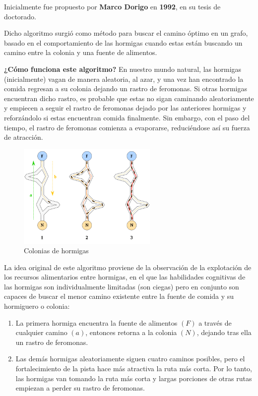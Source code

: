 \documentclass[a4paper, 11pt]{article} %
\begin{document}
Inicialmente fue propuesto por \textbf{Marco Dorigo} en \textbf{1992}, en su tesis de doctorado.

Dicho algoritmo surgió como método para buscar el camino óptimo en un grafo, basado en el comportamiento de las hormigas cuando estas están buscando un camino entre la colonia y una fuente de alimentos.

\textbf{¿Cómo funciona este algoritmo?} En nuestro mundo natural, las hormigas (inicialmente) vagan de manera aleatoria, al azar, y una vez han encontrado la comida regresan a su colonia dejando un rastro de feromonas. Si otras hormigas encuentran dicho rastro, es probable que estas no sigan caminando aleatoriamente y empiecen a seguir el rastro de feromonas dejado por las anteriores hormigas y reforzándolo si estas encuentran comida finalmente. Sin embargo, con el paso del tiempo, el rastro de feromonas comienza a evaporarse, reduciéndose así su fuerza de atracción.

\begin{figure}[H]
\centering
\includegraphics[width=0.6\textwidth]{Hormigas.png}
\caption{Colonias de hormigas}
\label{Colonias de hormigas}
\end{figure}

La idea original de este algoritmo proviene de la observación de la explotación de los recursos alimentarios entre hormigas, en el que las habilidades cognitivas de las hormigas son individualmente limitadas (son ciegas) pero en conjunto son capaces de buscar el menor camino existente entre la fuente de comida y su hormiguero o colonia:

\begin{enumerate}
    \item La primera hormiga encuentra la fuente de alimentos $(F)$ a través de cualquier camino $(a)$, entonces retorna a la colonia $(N)$, dejando tras ella un rastro de feromonas.
    \item Las demás hormigas aleatoriamente siguen cuatro caminos posibles, pero el fortalecimiento de la pista hace más atractiva la ruta más corta. Por lo tanto, las hormigas van tomando la ruta más corta y largas porciones de otras rutas empiezan a perder su rastro de feromonas.
\end{enumerate}
\end{document}
